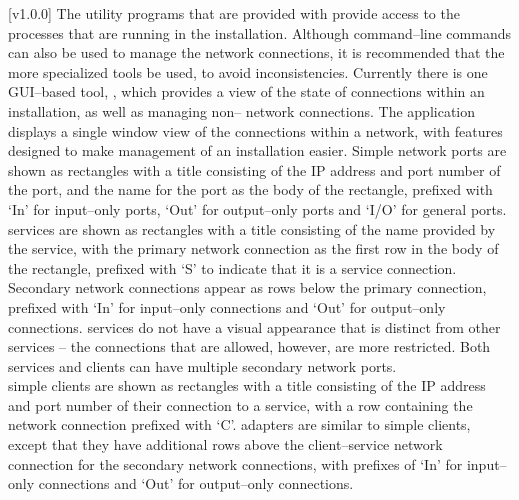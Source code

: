[v1.0.0]
The utility programs that are provided with \mplusm{} provide access to the processes that
are running in the \mplusm{} installation.
Although command--line \yarp{} commands can also be used to manage the network
connections, it is recommended that the more specialized \mplusm{} tools be used, to avoid
inconsistencies.
Currently there is one GUI--based tool, ,
which provides a view of the state of connections within an \mplusm{} installation, as
well as managing non--\mplusm{} \yarp{} network connections.
The  application displays a single window
view of the connections within a \yarp{} network, with features designed to make
management of an \mplusm{} installation easier.
Simple \yarp{} network ports are shown as rectangles with a title consisting of the IP
address and port number of the port, and the \yarp{} name for the port as the body of the
rectangle, prefixed with `In' for input--only ports, `Out' for output--only ports and
`I/O' for general ports.\\

\mplusm{} services are shown as rectangles with a title consisting of the name provided by
the service, with the primary \yarp{} network connection as the first row in the body of
the rectangle, prefixed with `S' to indicate that it is a service connection.
Secondary \yarp{} network connections appear as rows below the primary connection,
prefixed with `In' for input--only connections and `Out' for output--only connections.
\mplusm{}  services do not have a visual appearance that is distinct from
other \mplusm{} services -- the connections that are allowed, however, are more
restricted.
Both \mplusm{} services and clients can have multiple secondary \yarp{} network ports.\\

\mplusm{} simple clients are shown as rectangles with a title consisting of the IP address
and port number of their connection to a service, with a row containing the \yarp{}
network connection prefixed with `C'.
\mplusm{} adapters are similar to \mplusm{} simple clients, except that they have
additional rows above the client--service \yarp{} network connection for the secondary
\yarp{} network connections, with prefixes of `In' for input--only connections and `Out'
for output--only connections.\\

